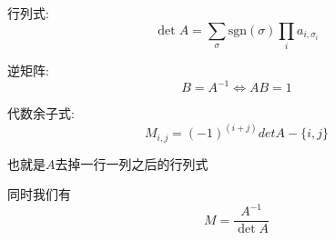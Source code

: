 行列式: $$\det A = \sum_{\sigma} \text{sgn}(\sigma) \prod_{i}a_{i, \sigma_i}$$

逆矩阵: $$B = A^{-1} \iff AB = 1$$

代数余子式: $$M_{i, j} = (-1)^{(i + j)} det{A - \{i, j\}}$$

也就是$A$去掉一行一列之后的行列式

同时我们有 $$ M = \frac {A^{-1}} {\det A} $$